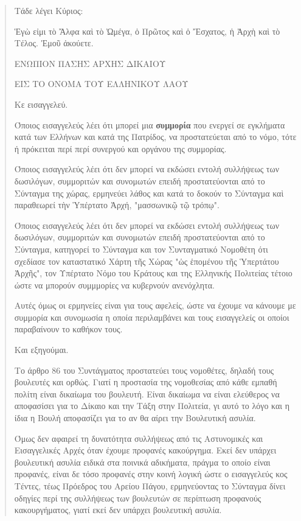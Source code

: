 \documentclass[a4paper]{article}
\begin{document}
\begin{itemize}
\begin{quote}
{Τάδε λέγει Κύριος:

Ἑγὼ εἰμι τὸ Ἄλφα καὶ τὸ Ὠμέγα, ὁ Πρῶτος καὶ ὁ Ἔσχατος, ἡ Ἀρχὴ καὶ τὸ Τέλος. Ἐμοῦ ἀκούετε.

ΕΝΩΠΙΟΝ ΠΑΣΗΣ ΑΡΧΗΣ ΔΙΚΑΙΟΥ

ΕΙΣ ΤΟ ΟΝΟΜΑ ΤΟΥ ΕΛΛΗΝΙΚΟΥ ΛΑΟΥ

}

Κε εισαγγελεύ.

Όποιος εισαγγελεύς λέει ότι μπορεί μια \textbf{συμμορία} που ενεργεί σε εγκλήματα κατά των Ελλήνων και κατά της Πατρίδος, να προστατεύεται από το νόμο, τότε ή πρόκειται περί περί συνεργού και οργάνου της συμμορίας.

Όποιος εισαγγελεύς λέει ότι δεν μπορεί να εκδώσει εντολή συλλήψεως των δωσιλόγων, συμμοριτών  και συνομωτών επειδή προστατεύονται από το Σύνταγμα της χώρας, ερμηνεύει λάθος και κατά το δοκούν το Σύνταγμα καὶ παραθεωρεί τὴν Ὑπέρτατο Ἀρχή, "μασσωνικῷ τῷ τρόπῳ".

Όποιος εισαγγελεύς λέει ότι δεν μπορεί να εκδώσει εντολή συλλήψεως των δωσιλόγων, συμμοριτών  και συνομωτών επειδή προστατεύονται από το Σύνταγμα, κατηγορεί το Σύνταγμα και τον Συνταγματικό Νομοθέτη ότι σχεδίασε τον καταστατικό Χάρτη τῆς Χώρας "ὡς ἑπομένου τῆς Ὑπερτάτου Ἀρχῆς", τον Υπέρτατο Νόμο του Κράτους και της Ελληνικής Πολιτείας τέτοιο ώστε να μπορούν συμμμορίες να κυβερνούν ανενόχλητα.

Αυτές όμως οι ερμηνείες είναι για τους αφελείς, ώστε να έχουμε να κάνουμε με συμμορία και συνομωσία η οποία περιλαμβάνει και τους εισαγγελείς οι οποίοι παραβαίνουν το καθήκον τους.

Και εξηγούμαι.

Το άρθρο 86 του Συντάγματος προστατεύει τους νομοθέτες, δηλαδή τους βουλευτές και ορθώς. Γιατί η προστασία της νομοθεσίας από κάθε εμπαθή πολίτη είναι δικαίωμα του βουλευτή. Είναι δικαίωμα να είναι ελεύθερος να αποφασίσει για το Δίκαιο και την Τάξη στην Πολιτεία, γι αυτό το λόγο και η ίδια η Βουλή αποφασίζει για το αν θα αίρει την Βουλευτική ασυλία.

Όμως δεν αφαιρεί τη δυνατότητα συλλήψεως από τις Αστυνομικές και Εισαγγελικές Αρχές όταν έχουμε προφανές κακούργημα. Εκεί δεν υπάρχει βουλευτική ασυλία ειδικά στα ποινικά αδικήματα, πράγμα το οποίο είναι προφανές, είναι δε τόσο προφανές στην κοινή λογική ώστε ο εισαγγελεύς κος Τέντες, τέως Πρόεδρος του Αρείου Πάγου, ερμηνεύοντας το Σύνταγμα δίνει οδηγίες περί της συλλήψεως των βουλευτών σε περίπτωση προφανούς κακουργήματος, γιατί εκεί δεν υπάρχει βουλευτική ασυλία.


\end{quote}
\end{itemize}
\end{document}
